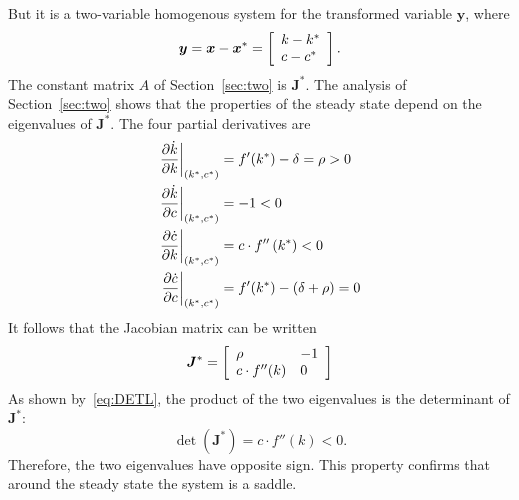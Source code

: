 \documentclass[letterpaper,12pt,leqno]{article}
\begin{document}
But it is a two-variable homogenous system for the transformed variable $\bm{y}$, where
\begin{equation*}
\bm{y}=\bm{x}-\bm{x}^{*}=\left[ 
\begin{array}{l}
k-k^{*}\\ 
c-c^{*}
\end{array} \right].
\end{equation*}
The constant matrix $A$ of Section~\ref{sec:two} is $\bm{J}^{*}$. The analysis of Section~\ref{sec:two} shows that the properties of the steady state depend on the eigenvalues of $\bm{J}^{*}$. The four partial derivatives are
\begin{align*}
\left.\frac{\partial \dot{k}}{\partial k}\right\vert_{(k^{*},c^{*})}&=f'(k^{*}) -\delta =\rho >0 \\
\left.\frac{\partial \dot{k}}{\partial c}\right\vert_{(k^{*},c^{*})}&=-1<0 \\
\left.\frac{\partial \dot{c}}{\partial k}\right\vert_{(k^{*},c^{*})}&=c\cdot f''\left( k^{*} \right) <0 \\
\left.\frac{\partial \dot{c}}{\partial c}\right\vert_{(k^{*},c^{*})}&=f'(k^{*}) -\left( \delta +\rho \right) =0
\end{align*}
It follows that the Jacobian matrix can be written 
\begin{equation*}
\bm{J}^{*}=\left[ 
\begin{array}{ll}
\rho  & -1  \\ 
c\cdot f''(k) & 0
\end{array} \right]
\end{equation*}
As shown by~\eqref{eq:DETL}, the product of the two eigenvalues is the determinant of $\bm{J}^{*}$:  \[\det(\bm{J}^{*})=c\cdot f''(k) <0.\] Therefore, the two eigenvalues have opposite sign. This property confirms that around the steady state the system is a saddle.
\end{document}
